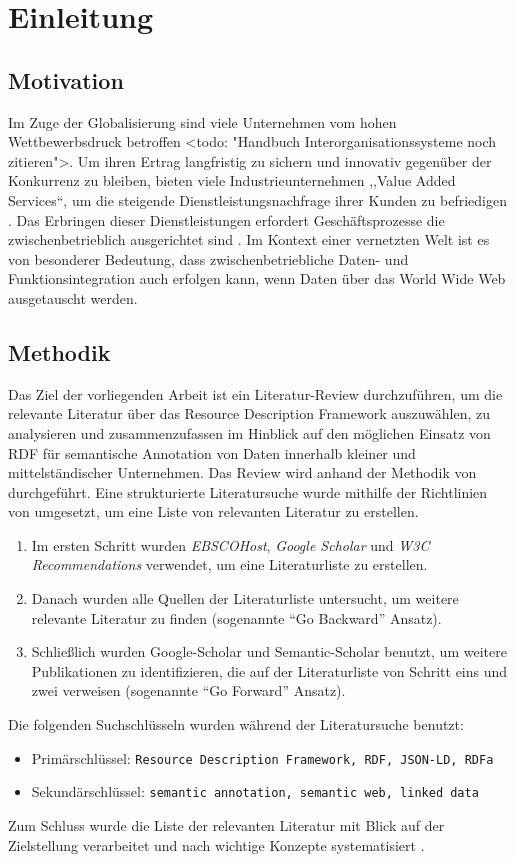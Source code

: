 \section{Einleitung}
\subsection{Motivation}
Im Zuge der Globalisierung sind viele Unternehmen vom hohen Wettbewerbsdruck betroffen <todo: "Handbuch Interorganisationssysteme noch zitieren">. Um ihren Ertrag langfristig zu sichern und innovativ gegenüber der Konkurrenz zu bleiben, bieten viele Industrieunternehmen ,,Value Added Services``, um die steigende Dienstleistungsnachfrage ihrer Kunden zu befriedigen \citep[vgl.][S. 4]{Meffert2015}. Das Erbringen dieser Dienstleistungen erfordert Geschäftsprozesse die zwischenbetrieblich ausgerichtet sind \parencite[vgl.][S.19]{fleisch2001netzwerkunternehmen}. Im Kontext einer vernetzten Welt \parencite[vgl.]{bmwi2013} ist es von besonderer Bedeutung, dass zwischenbetriebliche Daten- und Funktionsintegration auch erfolgen kann, wenn Daten über das World Wide Web ausgetauscht werden. 

\subsection{Methodik}
Das Ziel der vorliegenden Arbeit ist ein Literatur-Review durchzuführen, um die relevante Literatur über das Resource Description Framework auszuwählen, zu analysieren und zusammenzufassen im Hinblick auf den möglichen Einsatz von RDF für semantische Annotation von Daten innerhalb kleiner und mittelständischer Unternehmen. Das Review wird anhand der Methodik von \cite{fettke2006state} durchgeführt. Eine strukturierte Literatursuche wurde mithilfe der Richtlinien von \cite[S. XVI]{webster2002analyzing} umgesetzt, um eine Liste von relevanten Literatur zu erstellen. 
\begin{enumerate}
	\item Im ersten Schritt wurden \emph{EBSCOHost}, \emph{Google Scholar} und \emph{W3C Recommendations} verwendet, um eine Literaturliste zu erstellen.
	\item Danach wurden alle Quellen der Literaturliste untersucht, um weitere relevante Literatur zu finden (sogenannte \hyphenquote{german}{Go Backward} Ansatz).
	\item Schließlich wurden Google-Scholar und Semantic-Scholar benutzt, um weitere Publikationen zu identifizieren, die auf der Literaturliste von Schritt eins und zwei verweisen (sogenannte \hyphenquote{german}{Go Forward} Ansatz).
\end{enumerate}
Die folgenden Suchschlüsseln wurden während der Literatursuche benutzt:
\begin{itemize}
	\item Primärschlüssel: \texttt{Resource Description Framework, RDF, JSON-LD, RDFa}
	\item Sekundärschlüssel: \texttt{semantic annotation, semantic web, linked data}
\end{itemize}
Zum Schluss wurde die Liste der relevanten Literatur mit Blick auf der Zielstellung verarbeitet und nach wichtige Konzepte systematisiert \parencite[vgl.][S. XVI]{webster2002analyzing}.

